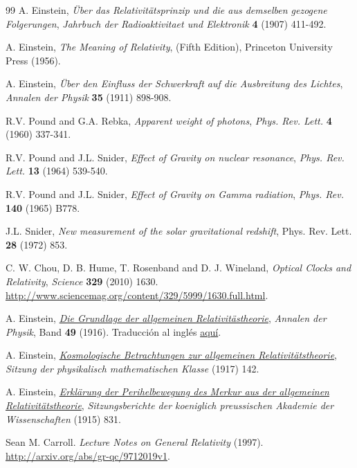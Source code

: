 \begin{thebibliography}{99}
 A. Einstein,  \textit{\"Uber das Relativit\"atsprinzip und die aus demselben gezogene Folgerungen},   \textsl{Jahrbuch der Radioaktivitaet und Elektronik}   \textbf{4} (1907) 411-492.

 A. Einstein, \emph{The Meaning of Relativity}, (Fifth
Edition), Princeton University Press (1956).

 A. Einstein,  \textit{\"Uber den Einfluss der Schwerkraft auf die Ausbreitung des Lichtes},   \textsl{Annalen der Physik}   \textbf{35} (1911) 898-908.

 R.V. Pound and G.A. Rebka,  \textit{Apparent weight of photons},   \textsl{Phys. Rev. Lett.}   \textbf{4} (1960) 337-341.

 R.V. Pound and J.L. Snider,  \textit{Effect of Gravity on nuclear resonance},   \textsl{Phys. Rev. Lett.}   \textbf{13} (1964) 539-540.

 R.V. Pound and J.L. Snider,  \textit{Effect of Gravity on Gamma radiation},   \textsl{Phys. Rev.}   \textbf{140} (1965) B778.

 J.L. Snider,  \textit{New measurement of the solar gravitational redshift}, {\rm Phys. Rev. Lett.}   \textbf{28} (1972) 853.

 C. W. Chou, D. B. Hume, T. Rosenband and D. J. Wineland,  \textit{Optical Clocks and Relativity},   \textsl{Science}   \textbf{329} (2010) 1630. \url{http://www.sciencemag.org/content/329/5999/1630.full.html}.

 A. Einstein, \href{https://docs.google.com/open?id=0B4RSIcYW5V0HMWY1YzM2MjAtMmJhMy00NmQ5LWFhMjEtNjdlODhhNjcxZTFk} \textit{Die Grundlage der allgemeinen Relativitästheorie},   \textsl{Annalen der Physik}, Band   \textbf{49} (1916). Traducción al inglés \href{http://goo.gl/E2YFn}{aquí}.

 A. Einstein, \href{https://goo.gl/A8miy} \textit{Kosmologische Betrachtungen zur allgemeinen Relativitätstheorie},   \textsl{Sitzung der physikalisch mathematischen Klasse} (1917) 142.

 A. Einstein, \href{https://docs.google.com/open?id=0B4RSIcYW5V0Hd0haajhUS0tRems} \textit{Erkl\"arung der Perihelbewegung des Merkur aus der allgemeinen Relativit\"atstheorie},   \textsl{Sitzungsberichte der koeniglich preussischen Akademie der Wissenschaften} (1915) 831.



 Sean M. Carroll.  \textit{Lecture Notes on General Relativity} (1997). \url{http://arxiv.org/abs/gr-qc/9712019v1}.


\end{thebibliography}
